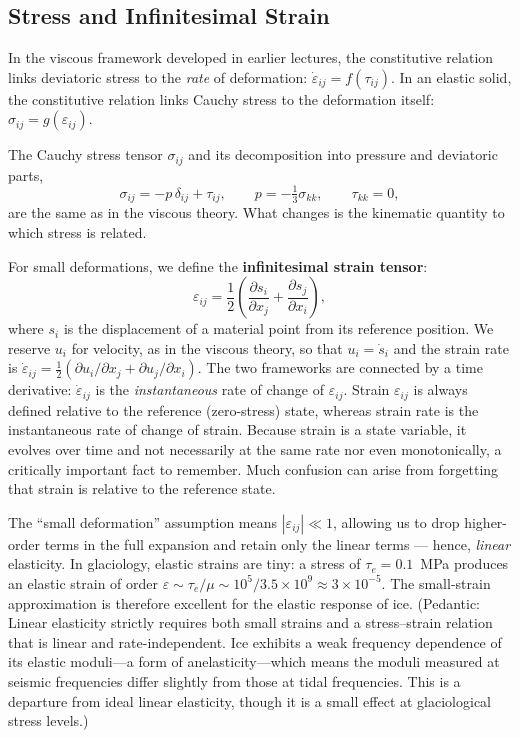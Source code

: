\documentclass[11pt]{article}
\begin{document}
\subsection{Stress and Infinitesimal Strain}
\label{sec:strain}

In the viscous framework developed in earlier lectures, the constitutive relation links deviatoric stress to the \textit{rate} of deformation: $\dot{\varepsilon}_{ij} = f(\tau_{ij})$.  In an elastic solid, the constitutive relation links Cauchy stress to the deformation itself: $\sigma_{ij} = g(\varepsilon_{ij})$.

\medskip
\noindent The Cauchy stress tensor $\sigma_{ij}$ and its decomposition into pressure and deviatoric parts,
\begin{equation}
  \sigma_{ij} = -p\,\delta_{ij} + \tau_{ij}, \qquad p = -\tfrac{1}{3}\sigma_{kk}, \qquad \tau_{kk} = 0,
  \label{eq:stress_decomposition}
\end{equation}
are the same as in the viscous theory.  What changes is the kinematic quantity to which stress is related.

\medskip
\noindent For small deformations, we define the \textbf{infinitesimal strain tensor}:
\begin{equation}
  \varepsilon_{ij} = \frac{1}{2}\!\left(\frac{\partial s_i}{\partial x_j} + \frac{\partial s_j}{\partial x_i}\right),
  \label{eq:strain_tensor}
\end{equation}
where $s_i$ is the displacement of a material point from its reference position.  We reserve $u_i$ for velocity, as in the viscous theory, so that $u_i = \dot{s}_i$ and the strain rate is $\dot{\varepsilon}_{ij} = \frac{1}{2}(\partial u_i / \partial x_j + \partial u_j / \partial x_i)$.  The two frameworks are connected by a time derivative: $\dot{\varepsilon}_{ij}$ is the \emph{instantaneous} rate of change of $\varepsilon_{ij}$. Strain $\varepsilon_{ij}$ is always defined relative to the reference (zero-stress) state, whereas strain rate is the instantaneous rate of change of strain.  Because strain is a state variable, it evolves over time and not necessarily at the same rate nor even monotonically, a critically important fact to remember. Much confusion can arise from forgetting that strain is relative to the reference state. 

\medskip
\noindent The ``small deformation'' assumption means $|\varepsilon_{ij}| \ll 1$, allowing us to drop higher-order terms in the full expansion and retain only the linear terms --- hence, \emph{linear} elasticity. In glaciology, elastic strains are tiny: a stress of $\tau_e = 0.1$~MPa produces an elastic strain of order $\varepsilon \sim \tau_e / \mu \sim 10^5 / 3.5 \times 10^9 \approx 3 \times 10^{-5}$.  The small-strain approximation is therefore excellent for the elastic response of ice. (Pedantic: Linear elasticity strictly requires both small strains and a stress--strain relation that is linear and rate-independent.  Ice exhibits a weak frequency dependence of its elastic moduli---a form of anelasticity---which means the moduli measured at seismic frequencies differ slightly from those at tidal frequencies.  This is a departure from ideal linear elasticity, though it is a small effect at glaciological stress levels.)
\end{document}
